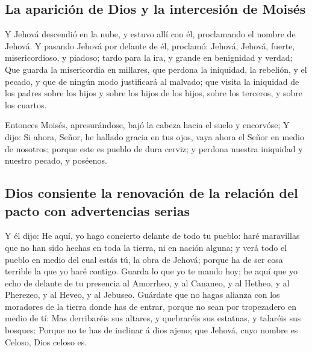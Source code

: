 \hypertarget{la-apariciuxf3n-de-dios-y-la-intercesiuxf3n-de-moisuxe9s}{%
\subsection{La aparición de Dios y la intercesión de
Moisés}\label{la-apariciuxf3n-de-dios-y-la-intercesiuxf3n-de-moisuxe9s}}

 Y Jehová descendió en la nube, y estuvo allí con él,
proclamando el nombre de Jehová.  Y pasando Jehová por
delante de él, proclamó: Jehová, Jehová, fuerte, misericordioso, y
piadoso; tardo para la ira, y grande en benignidad y verdad;
 Que guarda la misericordia en millares, que perdona la
iniquidad, la rebelión, y el pecado, y que de ningún modo justificará al
malvado; que visita la iniquidad de los padres sobre los hijos y sobre
los hijos de los hijos, sobre los terceros, y sobre los cuartos.

 Entonces Moisés, apresurándose, bajó la cabeza hacia el
suelo y encorvóse;  Y dijo: Si ahora, Señor, he hallado
gracia en tus ojos, vaya ahora el Señor en medio de nosotros; porque
este es pueblo de dura cerviz; y perdona nuestra iniquidad y nuestro
pecado, y poséenos.

\hypertarget{dios-consiente-la-renovaciuxf3n-de-la-relaciuxf3n-del-pacto-con-advertencias-serias}{%
\subsection{Dios consiente la renovación de la relación del pacto con
advertencias
serias}\label{dios-consiente-la-renovaciuxf3n-de-la-relaciuxf3n-del-pacto-con-advertencias-serias}}

 Y él dijo: He aquí, yo hago concierto delante de todo tu
pueblo: haré maravillas que no han sido hechas en toda la tierra, ni en
nación alguna; y verá todo el pueblo en medio del cual estás tú, la obra
de Jehová; porque ha de ser cosa terrible la que yo haré contigo.
 Guarda lo que yo te mando hoy; he aquí que yo echo de
delante de tu presencia al Amorrheo, y al Cananeo, y al Hetheo, y al
Pherezeo, y al Heveo, y al Jebuseo.  Guárdate que no hagas
alianza con los moradores de la tierra donde has de entrar, porque no
sean por tropezadero en medio de tí:  Mas derribaréis sus
altares, y quebraréis sus estatuas, y talaréis sus bosques:
 Porque no te has de inclinar á dios ajeno; que Jehová,
cuyo nombre es Celoso, Dios celoso es.

